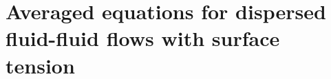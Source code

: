 \section{Averaged equations for dispersed fluid-fluid flows with surface tension}%
\label{sec:averaged_surface}


